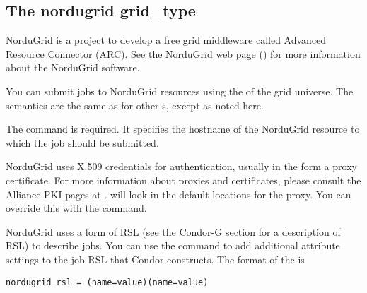
\subsection{\label{sec:NorduGrid}The nordugrid grid\_type }

NorduGrid is a project to develop a free grid middleware called Advanced  
Resource Connector (ARC). See the NorduGrid web page
() for more information about the NorduGrid
software.

You can submit jobs to NorduGrid resources using the 
 of the grid universe. The semantics are the same as
for other s, except as noted here.

The command  is required. It specifies the
hostname of the NorduGrid resource to which the job should be submitted.

NorduGrid uses X.509 credentials for authentication, usually in the form a
proxy certificate. For more information about proxies and certificates,
please consult the Alliance PKI pages at
.
 will look in the default locations for the proxy. You can 
override this with the  command.

NorduGrid uses a form of RSL (see the Condor-G section for a description
of RSL) to describe jobs. You can use the 
command to add additional attribute settings to the job RSL that Condor
constructs. The format of the  is
\begin{verbatim}
nordugrid_rsl = (name=value)(name=value)
\end{verbatim}
